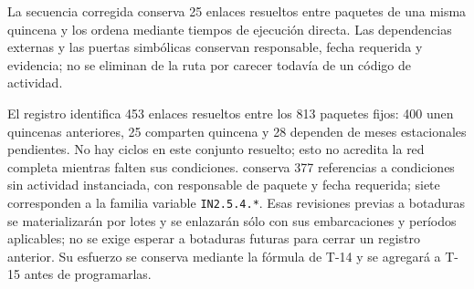 La secuencia corregida conserva 25 enlaces resueltos entre paquetes de una misma quincena y los ordena mediante tiempos de ejecución directa. Las dependencias externas y las puertas simbólicas conservan responsable, fecha requerida y evidencia; no se eliminan de la ruta por carecer todavía de un código de actividad.

El registro  identifica 453 enlaces resueltos entre los 813 paquetes fijos: 400 unen quincenas anteriores, 25 comparten quincena y 28 dependen de meses estacionales pendientes. No hay ciclos en este conjunto resuelto; esto no acredita la red completa mientras falten sus condiciones.  conserva 377 referencias a condiciones sin actividad instanciada, con responsable de paquete y fecha requerida; siete corresponden a la familia variable \texttt{IN2.5.4.*}. Esas revisiones previas a botaduras se materializarán por lotes y se enlazarán sólo con sus embarcaciones y períodos aplicables; no se exige esperar a botaduras futuras para cerrar un registro anterior. Su esfuerzo se conserva mediante la fórmula de T-14 y se agregará a T-15 antes de programarlas.




